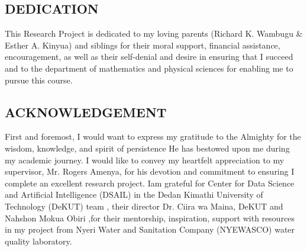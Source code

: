 \documentclass[12pt]{report}
\begin{document}
\renewcommand{\bibname}{\centering REFERENCES}


\linespread{1.5}


%
\subsection*{DEDICATION}
\par
This Research Project is dedicated to my loving parents (Richard K. Wambugu \& Esther A. Kinyua) and siblings
for their moral support, financial assistance, encouragement, as well
as their self-denial and desire in ensuring that I succeed and to the
department of mathematics and physical sciences for enabling me
to pursue this course.
\par

\clearpage

\subsection*{ACKNOWLEDGEMENT}
First and foremost, I would want to express my gratitude to the
Almighty for the wisdom, knowledge, and spirit of persistence He
has bestowed upon me during my academic journey. I would like
to convey my heartfelt appreciation to my supervisor, Mr. Rogers
Amenya, for his devotion and commitment to ensuring I complete
an excellent research project. Iam grateful for Center for Data
Science and Artificial Intelligence (DSAIL) in the Dedan Kimathi
University of Technology (DeKUT) team , their director Dr. Ciira
wa Maina, DeKUT and Nahshon Mokua Obiri ,for their mentorship,
inspiration, support with resources in my project from Nyeri Water
and Sanitation Company (NYEWASCO) water quality laboratory.
\clearpage


\renewcommand{\sectionname}{}
\renewcommand\thesection{\arabic{section}}
\end{document}
